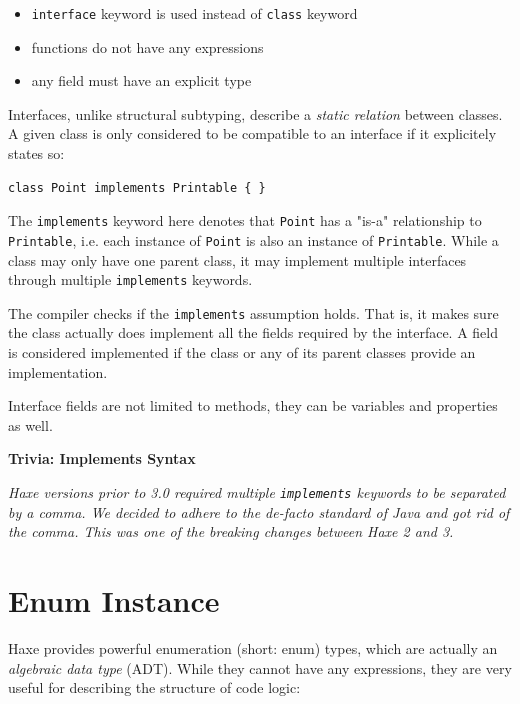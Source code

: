 \documentclass[a4paper,oneside]{book}
\newcommand{\type}[1]{\texttt{#1}}
\newcommand{\expr}[1]{\texttt{#1}}
\newenvironment{myshaded}
  {\def\FrameCommand{\fboxsep=\topsep\colorbox{bgcolor}}%
  \MakeFramed {\advance\hsize-\width \FrameRestore}}%
 {\endMakeFramed}
\newcommand{\trivia}[2]
	{\begin{myshaded}\noindent\textbf{Trivia: #1}\par\nobreak\noindent\ignorespaces\textit{#2}\end{myshaded}}
\begin{document}
\begin{itemize}
	\item \expr{interface} keyword is used instead of \expr{class} keyword
	\item functions do not have any expressions
	\item any field must have an explicit type
\end{itemize}
Interfaces, unlike structural subtyping, describe a \emph{static relation} between classes. A given class is only considered to be compatible to an interface if it explicitely states so:

\begin{lstlisting}
class Point implements Printable { }
\end{lstlisting}
The \expr{implements} keyword here denotes that \type{Point} has a "is-a" relationship to \type{Printable}, i.e. each instance of \type{Point} is also an instance of \type{Printable}. While a class may only have one parent class, it may implement multiple interfaces through multiple \expr{implements} keywords.

The compiler checks if the \expr{implements} assumption holds. That is, it makes sure the class actually does implement all the fields required by the interface. A field is considered implemented if the class or any of its parent classes provide an implementation.

Interface fields are not limited to methods, they can be variables and properties as well.

\trivia{Implements Syntax}{Haxe versions prior to 3.0 required multiple \expr{implements} keywords to be separated by a comma. We decided to adhere to the de-facto standard of Java and got rid of the comma. This was one of the breaking changes between Haxe 2 and 3.}


\section{Enum Instance}
\label{types-enum-instance}

Haxe provides powerful enumeration (short: enum) types, which are actually an \emph{algebraic data type} (ADT). While they cannot have any expressions, they are very useful for describing the structure of code logic:
\end{document}
